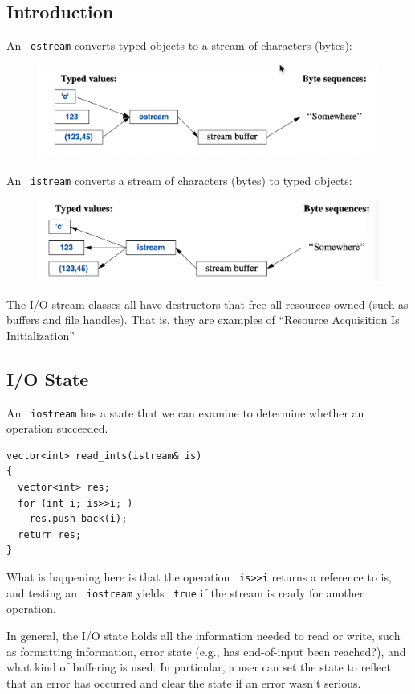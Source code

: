 \documentclass[11pt]{article}
\let\OldTexttt\texttt
\renewcommand{\texttt}[1]{\OldTexttt{\color{MidnightBlue} #1}}
\begin{document}
\subsection{Introduction}
\label{sec:orgc188f3b}
An \texttt{ostream} converts typed objects to a stream of characters (bytes):

\begin{figure}[htbp]
\centering
\includegraphics[width=.8\textwidth]{../images/ATourOfC++/6.png}
\label{}
\end{figure}

An \texttt{istream} converts a stream of characters (bytes) to typed objects:
\begin{figure}[htbp]
\centering
\includegraphics[width=.8\textwidth]{../images/ATourOfC++/7.png}
\label{}
\end{figure}

The I/O stream classes all have destructors that free all resources owned (such as buffers and
file handles). That is, they are examples of ``Resource Acquisition Is Initialization''
\subsection{I/O State}
\label{sec:org32d3fca}
An \texttt{iostream} has a state that we can examine to determine whether an operation succeeded.

\begin{verbatim}
vector<int> read_ints(istream& is)
{
  vector<int> res;
  for (int i; is>>i; )
    res.push_back(i);
  return res;
}
\end{verbatim}

What is happening here is that the operation \texttt{is>>i} returns a reference to is, and testing an
\texttt{iostream} yields \texttt{true} if the stream is ready for another operation.

In general, the I/O state holds all the information needed to read or write, such as formatting
information, error state (e.g., has end-of-input been reached?), and what kind of
buffering is used. In particular, a user can set the state to reflect that an error has occurred
and clear the state if an error wasn’t serious.
\end{document}
